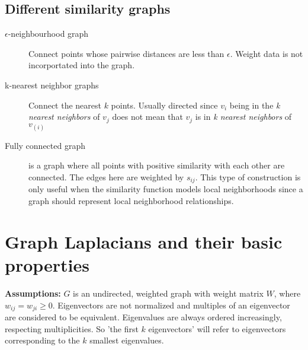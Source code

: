\documentclass[10pt,a4paper, nocenter]{report}
\begin{document}
		\section{Different similarity graphs}
		\begin{description}
			\item[$\epsilon$-neighbourhood graph] Connect points whose pairwise distances are less than $\epsilon$. Weight data is not incorportated into the graph. 
			\item[k-nearest neighbor graphs] Connect the nearest $k$ points. Usually directed since $v_{i}$ being in the \textit{k nearest neighbors} of $v_{j}$ does not mean that $v_{j}$ is in \textit{k nearest neighbors} of $v_(i)$
			\item[Fully connected graph] is a graph where all points with positive similarity with each other are connected. The edges here are weighted by $s_{ij}$. This type of construction is only useful when the similarity function models local neighborhoods since a graph should represent local neighborhood relationships. 
		\end{description}
	
		\chapter{Graph Laplacians and their basic properties}
		\textbf{Assumptions:} $G$ is an undirected, weighted graph with weight matrix $W$, where $w_{ij} = w_{ji} \ge 0$. Eigenvectors are not normalized and multiples of an eigenvector are considered to be equivalent. Eigenvalues are always ordered increasingly, respecting multiplicities. So 'the first $k$ eigenvectors' will refer to eigenvectors corresponding to the $k$ smallest eigenvalues.
		\\ \\
\end{document}
